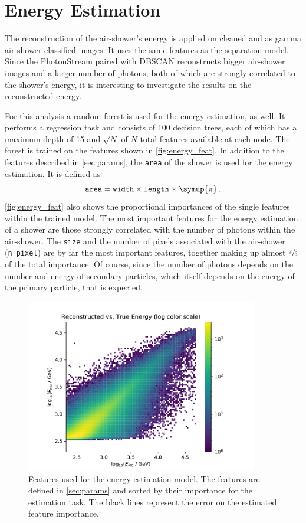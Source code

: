 \section{Energy Estimation}
%
The reconstruction of the air-shower's energy is applied on cleaned and as
gamma air-shower classified images. It uses the same features as the separation
model. Since the PhotonStream paired with DBSCAN reconstructs bigger air-shower
images and a larger number of photons, both of which are strongly correlated to the shower's energy, it is interesting to investigate the
results on the reconstructed energy.

For this analysis a random forest is used for the energy estimation, as well.
It performs a regression task and consists of \num{100} decision trees, each of which has a maximum depth of \num{15} and $\sqrt{N}$ of $N$ total features available at each node. The forest is trained on the
features shown in \autoref{fig:energy_feat}. In addition to the features described in \autoref{sec:params}, the \texttt{area} of the shower is used for the energy estimation. It is defined as
%
\begin{equation}
  \texttt{area} = \texttt{width}\times\texttt{length}\times\symup{\pi}\, .
\end{equation}
%
\autoref{fig:energy_feat} also shows the
proportional importances of the single features within the trained model. The
most important features for the energy estimation of a shower are those
strongly correlated with the number of photons within the air-shower. The
\texttt{size} and the number of pixels associated with the air-shower
(\texttt{n\_pixel}) are by far the most important features, together making up
almost $\sfrac{2}{3}$ of the total importance. Of course, since the number of
photons depends on the number and energy of secondary particles, which itself
depends on the energy of the primary particle, that is expected.
%
\begin{figure}
  \centering
  \includegraphics[width=0.9\textwidth, page=4]{Plots/results/DBSCAN/energy_performance.pdf}
  \caption{Features used for the energy estimation model. The features are defined in \autoref{sec:params} and sorted by their importance for the estimation task. The black lines represent the error on the estimated feature importance.}
  \label{fig:energy_feat}
\end{figure}
%

